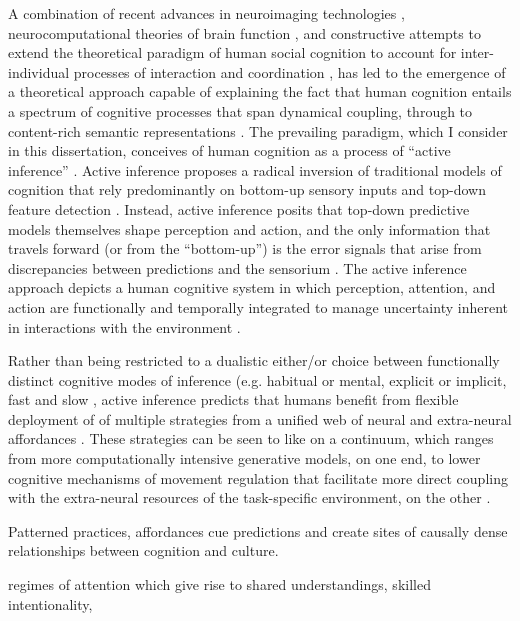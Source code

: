 \begin{CJK}{UTF8}{gbsn}
A combination of recent advances in neuroimaging technologies \citep{Frith2007}, neurocomputational theories of brain function \citep{Friston2010,Frith2010,Yufik2013,Clark2013}, and constructive attempts to extend the theoretical paradigm of human social cognition to account for inter-individual processes of interaction and coordination \citep{Sebanz2006,Dale2014}, has led to the emergence of a theoretical approach capable of explaining the fact that human cognition entails a spectrum of cognitive processes that span dynamical coupling, through to content-rich semantic representations \citep{Roepstorff2011,Ramstead2016}.  The prevailing paradigm, which I consider in this dissertation, conceives of human cognition as a process of ``active inference'' \citep{Friston2010}.  Active inference \citep[and the predictive coding paradigm which it extends, see][]{Clark2013} proposes a radical inversion of traditional models of cognition that rely predominantly on bottom-up sensory inputs and top-down feature detection \citep{Marr1985}. Instead, active inference posits that top-down predictive models themselves shape perception and action, and the only information that travels forward (or from the ``bottom-up'') is the error signals that arise from discrepancies between predictions and the sensorium \citep{Clark2015}.  The active inference approach  depicts a human cognitive system in which perception, attention, and action are functionally and temporally integrated to manage uncertainty inherent in interactions with the environment \citep{Clark2013}.

Rather than being restricted to a dualistic either/or choice between functionally distinct cognitive modes of inference (e.g. habitual or mental, explicit or implicit, fast and slow \citep[cf.][]{Dienes1999,Kahneman2011}, active inference predicts that humans benefit from flexible deployment of of multiple strategies from a unified web of neural and extra-neural affordances \citep{Pezzulo2013,Clark2015}.  These strategies can be seen to like on a continuum, which ranges from more computationally intensive generative models, on one end, to lower cognitive mechanisms of movement regulation that facilitate more direct coupling with the extra-neural resources of the task-specific environment, on the other \citep{Riley2011}.

Patterned practices, affordances cue predictions and create sites of causally dense relationships between cognition and culture.

regimes of attention which give rise to shared understandings, skilled intentionality,



\end{CJK}
